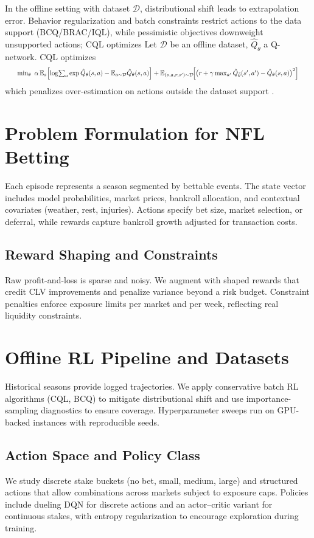 In the offline setting with dataset $\mathcal D$, distributional shift leads to extrapolation error. Behavior regularization and batch constraints restrict actions to the data support (BCQ/BRAC/IQL), while pessimistic objectives downweight unsupported actions; CQL optimizes
Let $\mathcal{D}$ be an offline dataset, $\hat Q_\theta$ a Q-network. CQL optimizes
\begin{equation*}
\resizebox{0.96\linewidth}{!}{$
\min_\theta\ \alpha\,\E_s\!\left[\log\!\sum_a \exp\hat Q_\theta(s,a) - \E_{a\sim\mathcal{D}} \hat Q_\theta(s,a)\right]
+ \E_{(s,a,r,s')\sim\mathcal{D}}\!\Big[\big(r+\gamma \max_{a'}\hat Q_{\bar\theta}(s',a')-\hat Q_\theta(s,a)\big)^2\Big]
$}
\end{equation*}
which penalizes over-estimation on actions outside the dataset support \citep{fujimoto2019,kumar2019bear,kumar2020,wu2019brac,kostrikov2021iql,levine2020,agarwal2020offline}.

\section{Problem Formulation for NFL Betting}
Each episode represents a season segmented by bettable events. The state vector includes model probabilities, market prices, bankroll allocation, and contextual covariates (weather, rest, injuries). Actions specify bet size, market selection, or deferral, while rewards capture bankroll growth adjusted for transaction costs.

\subsection{Reward Shaping and Constraints}
Raw profit-and-loss is sparse and noisy. We augment with shaped rewards that credit CLV improvements and penalize variance beyond a risk budget. Constraint penalties enforce exposure limits per market and per week, reflecting real liquidity constraints.

\section{Offline RL Pipeline and Datasets}
Historical seasons provide logged trajectories. We apply conservative batch RL algorithms (CQL, BCQ) to mitigate distributional shift and use importance-sampling diagnostics to ensure coverage. Hyperparameter sweeps run on GPU-backed instances with reproducible seeds.

\subsection{Action Space and Policy Class}
We study discrete stake buckets (no bet, small, medium, large) and structured actions that allow combinations across markets subject to exposure caps. Policies include dueling DQN for discrete actions and an actor--critic variant for continuous stakes, with entropy regularization to encourage exploration during training.

